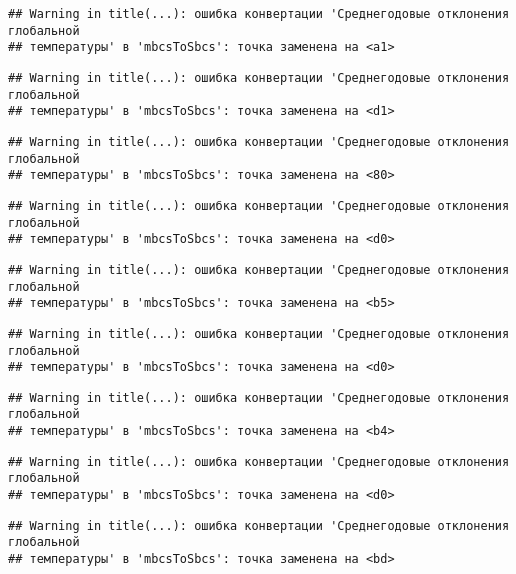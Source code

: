 \documentclass[
]{article}
\begin{document}
\begin{verbatim}
## Warning in title(...): ошибка конвертации 'Среднегодовые отклонения глобальной
## температуры' в 'mbcsToSbcs': точка заменена на <a1>
\end{verbatim}

\begin{verbatim}
## Warning in title(...): ошибка конвертации 'Среднегодовые отклонения глобальной
## температуры' в 'mbcsToSbcs': точка заменена на <d1>
\end{verbatim}

\begin{verbatim}
## Warning in title(...): ошибка конвертации 'Среднегодовые отклонения глобальной
## температуры' в 'mbcsToSbcs': точка заменена на <80>
\end{verbatim}

\begin{verbatim}
## Warning in title(...): ошибка конвертации 'Среднегодовые отклонения глобальной
## температуры' в 'mbcsToSbcs': точка заменена на <d0>
\end{verbatim}

\begin{verbatim}
## Warning in title(...): ошибка конвертации 'Среднегодовые отклонения глобальной
## температуры' в 'mbcsToSbcs': точка заменена на <b5>
\end{verbatim}

\begin{verbatim}
## Warning in title(...): ошибка конвертации 'Среднегодовые отклонения глобальной
## температуры' в 'mbcsToSbcs': точка заменена на <d0>
\end{verbatim}

\begin{verbatim}
## Warning in title(...): ошибка конвертации 'Среднегодовые отклонения глобальной
## температуры' в 'mbcsToSbcs': точка заменена на <b4>
\end{verbatim}

\begin{verbatim}
## Warning in title(...): ошибка конвертации 'Среднегодовые отклонения глобальной
## температуры' в 'mbcsToSbcs': точка заменена на <d0>
\end{verbatim}

\begin{verbatim}
## Warning in title(...): ошибка конвертации 'Среднегодовые отклонения глобальной
## температуры' в 'mbcsToSbcs': точка заменена на <bd>
\end{verbatim}
\end{document}
